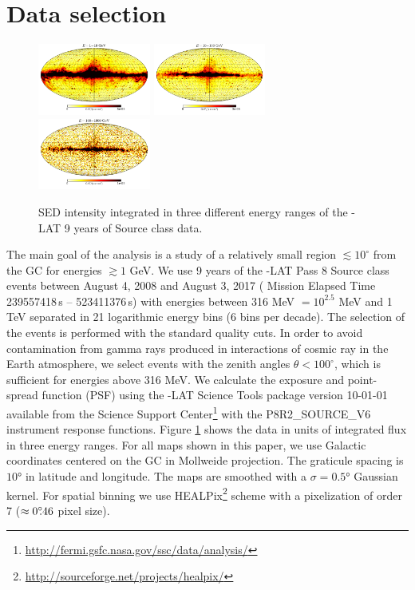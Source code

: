 \section{Data selection}


\begin{figure}[h]
\includegraphics[width=0.33\textwidth]{plots/Mollweide_data_source_range_0.pdf}
\includegraphics[width=0.33\textwidth]{plots/Mollweide_data_source_range_1.pdf}
\includegraphics[width=0.33\textwidth]{plots/Mollweide_data_source_range_2.pdf}
\caption{SED intensity integrated in three different energy ranges of the \Fermi-LAT 9 years of Source class data.
}
\label{fig:Maps_data}
\end{figure}

The main goal of the analysis is a study of a relatively small region $\lesssim 10^\circ$ from the GC for energies $\gtrsim 1$ GeV.
We use 9 years of the \Fermi-LAT Pass 8 Source class events
between August 4, 2008  and August 3, 2017 ({\Fermi} Mission Elapsed Time 239557418\,s -- 523411376\,s)
with energies between 316 MeV $ = 10^{2.5}$ MeV
and 1 TeV separated in 21 logarithmic energy bins (6 bins per decade).
The selection of the events is performed with the standard quality cuts.
In order to avoid contamination from gamma rays produced in interactions of cosmic ray in the Earth atmosphere, 
we select events with the zenith angles $\theta < 100^{\circ}$,
which is sufficient for energies above 316 MeV.
We calculate the exposure and point-spread function (PSF) using the {\Fermi}-LAT Science Tools package version 
10-01-01 available from the {\Fermi} Science Support Center\footnote{\url{http://fermi.gsfc.nasa.gov/ssc/data/analysis/}} 
with the P8R2\_SOURCE\_V6 instrument response functions.
Figure \ref{fig:Maps_data} shows the data in units of integrated flux in three energy ranges. For all maps shown in this paper, we use Galactic coordinates centered on the GC in Mollweide projection. The graticule spacing is $\ang{10}$ in latitude and longitude. The maps are smoothed with a $\sigma = \ang{0.5}$ Gaussian kernel.
For spatial binning we use HEALPix\footnote{\url{http://sourceforge.net/projects/healpix/}} \citep{2005ApJ...622..759G} scheme with a pixelization of order 7  ($\approx 0^\circ\!\!.46$ pixel size). 

